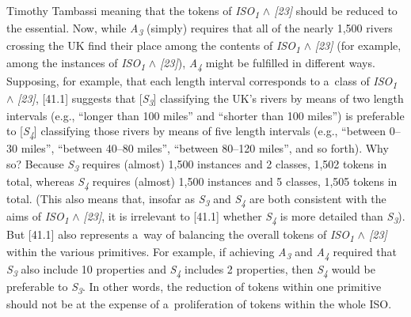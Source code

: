 \begin{artengenv}{Timothy Tambassi}
meaning that the tokens of \textit{ISO}\textit{\textsubscript{1}} \textit{${\wedge}$ [23]} should be reduced to the essential. Now, while \textit{A}\textit{\textsubscript{3}} (simply) requires that all of the nearly 1,500 rivers crossing the UK find their place among the contents of \textit{ISO}\textit{\textsubscript{1}} \textit{\textcolor[rgb]{0.1254902,0.12941177,0.14117648}{${\wedge}$}} \textit{[23]} (for example, among the instances of \textit{ISO}\textit{\textsubscript{1}} \textit{\textcolor[rgb]{0.1254902,0.12941177,0.14117648}{${\wedge}$}} \textit{[23]}), \textit{A}\textit{\textsubscript{4}} might be fulfilled in different ways. Supposing, for example, that each length interval corresponds to a~class of \textit{ISO}\textit{\textsubscript{1}} \textit{\textcolor[rgb]{0.1254902,0.12941177,0.14117648}{${\wedge}$}} \textit{[23]}, [41.1] suggests that [\textit{S}\textit{\textsubscript{3}}] classifying the UK's rivers by means of two length intervals (e.g., ``longer than 100 miles'' and ``shorter than 100 miles'') is preferable to [\textit{S}\textit{\textsubscript{4}}] classifying those rivers by means of five length intervals (e.g., ``between 0–30 miles'', ``between 40–80 miles'', ``between 80–120 miles'', and so forth). Why so? Because \textit{S}\textit{\textsubscript{3}} requires (almost) 1,500 instances and 2 classes, 1,502 tokens in total, whereas \textit{S}\textit{\textsubscript{4}} requires (almost) 1,500 instances and 5 classes, 1,505 tokens in total. (This also means that, insofar as \textit{S}\textit{\textsubscript{3}} and \textit{S}\textit{\textsubscript{4}} are both consistent with the aims of \textit{ISO}\textit{\textsubscript{1}} \textit{\textcolor[rgb]{0.1254902,0.12941177,0.14117648}{${\wedge}$}} \textit{[23]}, it is irrelevant to [41.1] whether \textit{S}\textit{\textsubscript{4}} is more detailed than \textit{S}\textit{\textsubscript{3}}). But [41.1] also represents a~way of balancing the overall tokens of \textit{ISO}\textit{\textsubscript{1}} \textit{${\wedge}$ [23]} within the various primitives. For example, if achieving \textit{A}\textit{\textsubscript{3}} and \textit{A}\textit{\textsubscript{4}} required that \textit{S}\textit{\textsubscript{3}} also include 10 properties and \textit{S}\textit{\textsubscript{4}} includes 2 properties, then \textit{S}\textit{\textsubscript{4}} would be preferable to \textit{S}\textit{\textsubscript{3}}. In other words, the reduction of tokens within one primitive should not be at the expense of a~proliferation of tokens within the whole ISO.




\end{artengenv}
